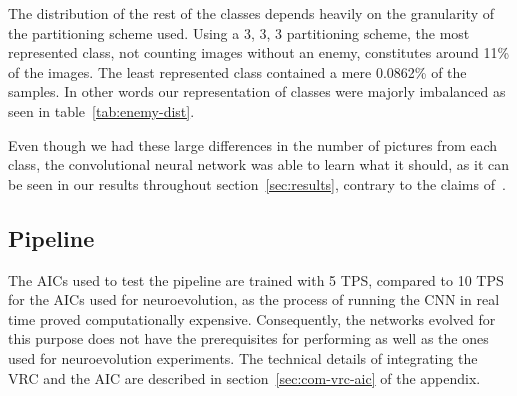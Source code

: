 The distribution of the rest of the classes depends heavily on the granularity of the partitioning scheme used. Using a 3, 3, 3 partitioning scheme, the most represented class, not counting images without an enemy, constitutes around 11\% of the images. The least represented class contained a mere 0.0862\% of the samples. In other words our representation of classes were majorly imbalanced as seen in table~\ref{tab:enemy-dist}.

Even though we had these large differences in the number of pictures from each class, the convolutional neural network was able to learn what it should, as it can be seen in our results throughout section~\ref{sec:results}, contrary to the claims of~\cite{balanced-classes}.



\subsection{Pipeline}
The AICs used to test the pipeline are trained with 5 TPS, compared to 10 TPS for the AICs used for neuroevolution, as the process of running the CNN in real time proved computationally expensive. Consequently, the networks evolved for this purpose does not have the prerequisites for performing as well as the ones used for neuroevolution experiments. The technical details of integrating the VRC and the AIC are described in section~\ref{sec:com-vrc-aic} of the appendix.









































